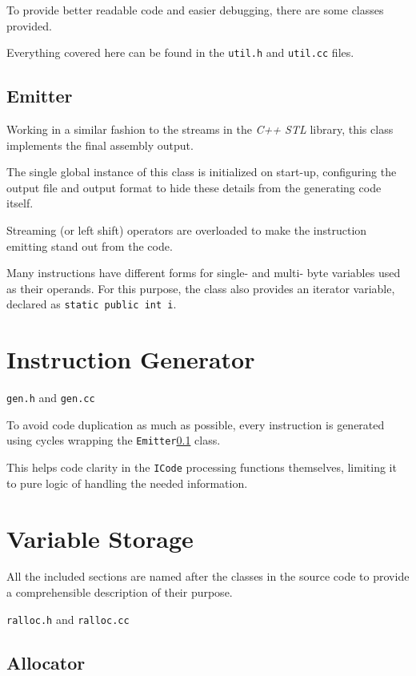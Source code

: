     To provide better readable code and easier debugging, there are some classes provided.

    Everything covered here can be found in the \texttt{util.h} and \texttt{util.cc} files.

        \subsection{Emitter}\label{emitter}

        Working in a similar fashion to the streams in the \emph{C++ STL} library, this class implements the final assembly output.

        The single global instance of this class is initialized on start-up, configuring the output file and output format to hide these details from the generating code itself.

        Streaming (or left shift) operators are overloaded to make the instruction emitting stand out from the code.

        Many instructions have different forms for single- and multi- byte variables used as their operands. For this purpose, the class also provides an iterator variable, declared as \texttt{static public int i}.

    \section{Instruction Generator}

    \texttt{gen.h} and \texttt{gen.cc}

    To avoid code duplication as much as possible, every instruction is generated using cycles wrapping the \texttt{Emitter}\ref{emitter} class.

    This helps code clarity in the \texttt{ICode} processing functions themselves, limiting it to pure logic of handling the needed information.

    \section{Variable Storage}

    All the included sections are named after the classes in the source code to provide a comprehensible description of their purpose.

    \texttt{ralloc.h} and \texttt{ralloc.cc}

        \subsection{Allocator}

